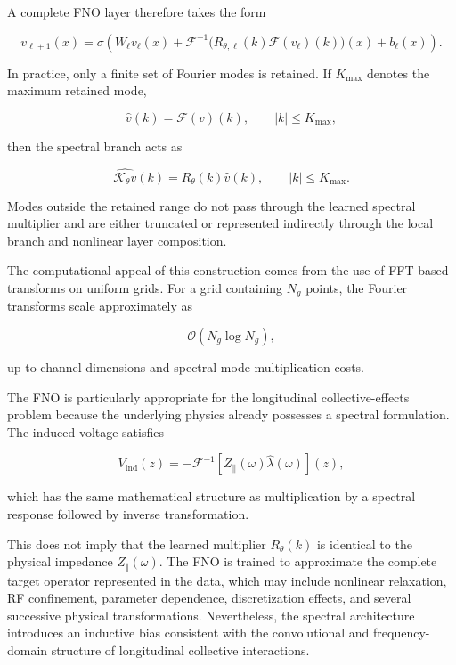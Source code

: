 A complete FNO layer therefore takes the form

\begin{equation}
\label{eq:98}
v_{\ell+1}(x)=\sigma\left(W_{\ell}v_{\ell}(x)+\mathcal F^{-1}\bigl(R_{\theta,\ell}(k)\mathcal F(v_{\ell})(k)\bigr)(x)+b_{\ell}(x)\right).
\end{equation}

In practice, only a finite set of Fourier modes is retained. If \(K_{\mathrm{max}}\) denotes the maximum retained mode,

\begin{equation}
\label{eq:99}
\widehat v(k)=\mathcal F(v)(k),\qquad|k|\le K_{\max},
\end{equation}

then the spectral branch acts as

\begin{equation}
\label{eq:100}
\widehat{\mathcal K_{\theta}v}(k)=R_{\theta}(k)\widehat v(k),\qquad|k|\le K_{\max}.
\end{equation}

Modes outside the retained range do not pass through the learned spectral multiplier and are either truncated or represented indirectly through the local branch and nonlinear layer composition.

The computational appeal of this construction comes from the use of FFT-based transforms on uniform grids. For a grid containing \(N_{g}\) points, the Fourier transforms scale approximately as

\begin{equation}
\label{eq:101}
\mathcal O(N_g\log N_g),
\end{equation}

up to channel dimensions and spectral-mode multiplication costs.

The FNO is particularly appropriate for the longitudinal collective-effects problem because the underlying physics already possesses a spectral formulation. The induced voltage satisfies

\begin{equation}
\label{eq:102}
V_{\mathrm{ind}}(z)=-\mathcal F^{-1}\left[Z_{\parallel}(\omega)\widehat\lambda(\omega)\right](z),
\end{equation}

which has the same mathematical structure as multiplication by a spectral response followed by inverse transformation.

This does not imply that the learned multiplier \(R_{\theta} ( k )\) is identical to the physical impedance \(Z_{\Vert} ( \omega ) .\) The FNO is trained to approximate the complete target operator represented in the data, which may include nonlinear relaxation, RF confinement, parameter dependence, discretization effects, and several successive physical transformations. Nevertheless, the spectral architecture introduces an inductive bias consistent with the convolutional and frequency-domain structure of longitudinal collective interactions.

